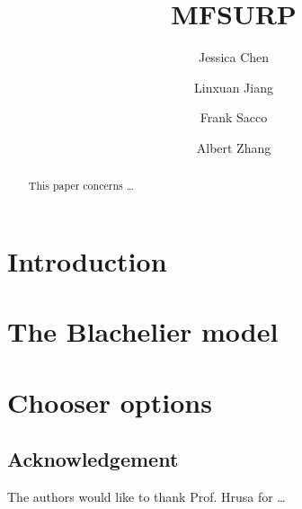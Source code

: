 \documentclass[reqno]{amsart}
\title{MFSURP}
\author{Jessica Chen}
\author{Linxuan Jiang}
\author{Frank Sacco}
\author{Albert Zhang}
\begin{document}
\begin{abstract}

    This paper concerns \dots 
\end{abstract}



\maketitle  
\tableofcontents

\section{Introduction}

\section{The Blachelier model}


\section{Chooser options}

\subsection*{Acknowledgement} The authors would like to thank Prof. Hrusa for \dots 

\end{document}
